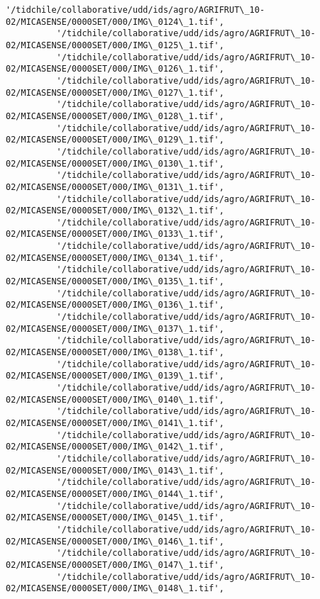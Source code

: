 \documentclass[11pt]{article}
\begin{document}
\begin{Verbatim}[commandchars=\\\{\}]
          '/tidchile/collaborative/udd/ids/agro/AGRIFRUT\_10-02/MICASENSE/0000SET/000/IMG\_0124\_1.tif',
          '/tidchile/collaborative/udd/ids/agro/AGRIFRUT\_10-02/MICASENSE/0000SET/000/IMG\_0125\_1.tif',
          '/tidchile/collaborative/udd/ids/agro/AGRIFRUT\_10-02/MICASENSE/0000SET/000/IMG\_0126\_1.tif',
          '/tidchile/collaborative/udd/ids/agro/AGRIFRUT\_10-02/MICASENSE/0000SET/000/IMG\_0127\_1.tif',
          '/tidchile/collaborative/udd/ids/agro/AGRIFRUT\_10-02/MICASENSE/0000SET/000/IMG\_0128\_1.tif',
          '/tidchile/collaborative/udd/ids/agro/AGRIFRUT\_10-02/MICASENSE/0000SET/000/IMG\_0129\_1.tif',
          '/tidchile/collaborative/udd/ids/agro/AGRIFRUT\_10-02/MICASENSE/0000SET/000/IMG\_0130\_1.tif',
          '/tidchile/collaborative/udd/ids/agro/AGRIFRUT\_10-02/MICASENSE/0000SET/000/IMG\_0131\_1.tif',
          '/tidchile/collaborative/udd/ids/agro/AGRIFRUT\_10-02/MICASENSE/0000SET/000/IMG\_0132\_1.tif',
          '/tidchile/collaborative/udd/ids/agro/AGRIFRUT\_10-02/MICASENSE/0000SET/000/IMG\_0133\_1.tif',
          '/tidchile/collaborative/udd/ids/agro/AGRIFRUT\_10-02/MICASENSE/0000SET/000/IMG\_0134\_1.tif',
          '/tidchile/collaborative/udd/ids/agro/AGRIFRUT\_10-02/MICASENSE/0000SET/000/IMG\_0135\_1.tif',
          '/tidchile/collaborative/udd/ids/agro/AGRIFRUT\_10-02/MICASENSE/0000SET/000/IMG\_0136\_1.tif',
          '/tidchile/collaborative/udd/ids/agro/AGRIFRUT\_10-02/MICASENSE/0000SET/000/IMG\_0137\_1.tif',
          '/tidchile/collaborative/udd/ids/agro/AGRIFRUT\_10-02/MICASENSE/0000SET/000/IMG\_0138\_1.tif',
          '/tidchile/collaborative/udd/ids/agro/AGRIFRUT\_10-02/MICASENSE/0000SET/000/IMG\_0139\_1.tif',
          '/tidchile/collaborative/udd/ids/agro/AGRIFRUT\_10-02/MICASENSE/0000SET/000/IMG\_0140\_1.tif',
          '/tidchile/collaborative/udd/ids/agro/AGRIFRUT\_10-02/MICASENSE/0000SET/000/IMG\_0141\_1.tif',
          '/tidchile/collaborative/udd/ids/agro/AGRIFRUT\_10-02/MICASENSE/0000SET/000/IMG\_0142\_1.tif',
          '/tidchile/collaborative/udd/ids/agro/AGRIFRUT\_10-02/MICASENSE/0000SET/000/IMG\_0143\_1.tif',
          '/tidchile/collaborative/udd/ids/agro/AGRIFRUT\_10-02/MICASENSE/0000SET/000/IMG\_0144\_1.tif',
          '/tidchile/collaborative/udd/ids/agro/AGRIFRUT\_10-02/MICASENSE/0000SET/000/IMG\_0145\_1.tif',
          '/tidchile/collaborative/udd/ids/agro/AGRIFRUT\_10-02/MICASENSE/0000SET/000/IMG\_0146\_1.tif',
          '/tidchile/collaborative/udd/ids/agro/AGRIFRUT\_10-02/MICASENSE/0000SET/000/IMG\_0147\_1.tif',
          '/tidchile/collaborative/udd/ids/agro/AGRIFRUT\_10-02/MICASENSE/0000SET/000/IMG\_0148\_1.tif',

\end{Verbatim}
\end{document}
